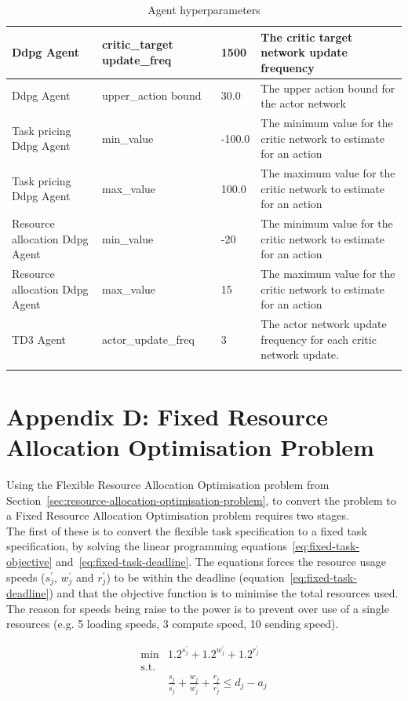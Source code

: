 \begin{longtable}{|p{2cm}|p{3.5cm}|p{2.5cm}|p{6cm}|}
        Ddpg Agent & critic\_target update\_freq & 1500 & The critic target network update frequency \\ \hline
        Ddpg Agent & upper\_action bound & 30.0 & The upper action bound for the actor network \\ \hline
        Task pricing Ddpg Agent & min\_value & -100.0 & The minimum value for the critic network to estimate for an
            action \\ \hline
        Task pricing Ddpg Agent & max\_value & 100.0 & The maximum value for the critic network to estimate for an
            action\\ \hline
        Resource allocation Ddpg Agent & min\_value & -20 & The minimum value for the critic network to estimate for an
            action \\ \hline
        Resource allocation Ddpg Agent & max\_value & 15 & The maximum value for the critic network to estimate for an
            action\\ \hline
        TD3 Agent & actor\_update\_freq & 3 & The actor network update frequency for each critic network update. \\ \hline
    \caption{Agent hyperparameters}
    \label{tab:agent_hyperparameters}
\end{longtable}

\section*{Appendix D: Fixed Resource Allocation Optimisation Problem}
\label{app:fixed-resource-allocation-optimisation-problem}
Using the Flexible Resource Allocation Optimisation problem from Section~\ref{sec:resource-allocation-optimisation-problem},
to convert the problem to a Fixed Resource Allocation Optimisation problem requires two stages. \\
The first of these is to convert the flexible task specification to a fixed task specification, by solving the linear
programming equations~\ref{eq:fixed-task-objective} and~\ref{eq:fixed-task-deadline}. The equations forces the resource
usage speeds ($s^{'}_j$, $w^{'}_j$ and $r^{'}_j$) to be within the deadline (equation~\ref{eq:fixed-task-deadline}) and
that the objective function is to minimise the total resources used. The reason for speeds being raise to the power is
to prevent over use of a single resources (e.g. 5 loading speeds, 3 compute speed, 10 sending speed).

\begin{align}
    \text{min} & 1.2^{s^{'}_j} + 1.2^{w^{'}_j} + 1.2^{r^{'}_j} \label{eq:fixed-task-objective} \\
    \mbox{s.t.} \nonumber \\
    & \frac{s_j}{s^{'}_j} + \frac{w_j}{w^{'}_j} + \frac{r_j}{r^{'}_j} \leq d_j - a_j \label{eq:fixed-task-deadline} \\
\end{align}

